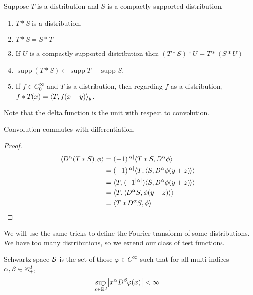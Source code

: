 \documentclass[10pt, twoside]{article}
\begin{document}
    \begin{lem} Suppose $T$ is a distribution and $S$ is a compactly supported
        distribution.  \begin{enumerate} \item $T*S$ is a distribution.  \item
            $T*S=S*T$ \item If $U$ is a compactly supported distribution then
            $(T*S)*U = T*(S*U)$ \item $\operatorname{supp}(T*S) \subset
            \operatorname{supp}T + \operatorname{supp}S$.  \item If $f \in
    C_0^{\infty}$ and $T$ is a distribution, then regarding $f$ as a
    distribution, $f*T(x) = \langle T,f(x-y)\rangle_y$.  \end{enumerate} \end{lem}

    \begin{rmk} Note that the delta function is the unit with respect to
    convolution.  \end{rmk}

    \begin{lem} Convolution commutes with differentiation.  \begin{proof}
        \begin{align*} \langle D^{\alpha}(T*S),\phi\rangle &= (-1)^{\lvert\alpha\rvert}
            \langle T*S,D^{\alpha} \phi\rangle \\ &= (-1)^{\lvert\alpha\rvert}
            \langle T,\langle S,D^{\alpha} \phi(y+z)\rangle\rangle\\ &=
            \langle T,(-1^{\lvert\alpha\rvert})\langle S,D^{\alpha} \phi(y+z)\rangle\rangle\\ &=
        \langle T, \langle D^{\alpha}S, \phi(y+z)\rangle\rangle \\ &= \langle T*D^{\alpha}S, \phi\rangle
    \end{align*} \end{proof} \end{lem}

    We will use the same tricks to define the Fourier transform of some
    distributions. We have too many distributions, so we extend our class of
    test functions.

    \begin{defn} Schwartz space $\mathcal{S}$ is the set of those $\varphi \in
        C^{\infty}$ such that for all multi-indices $\alpha, \beta \in \mathbb{Z}_+^d$,
        \[\sup_{x \in \R^d} \abs*{x^{\alpha}D^{\beta} \varphi(x)} < \infty.\]
    \end{defn}
\end{document}
